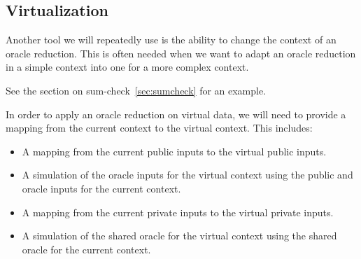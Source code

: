 



\subsection{Virtualization}

Another tool we will repeatedly use is the ability to change the context of an oracle reduction. This is often needed when we want to adapt an oracle reduction in a simple context into one for a more complex context.

See the section on sum-check~\ref{sec:sumcheck} for an example.

\begin{definition}
    \label{def:virtual_context_mapping}
    In order to apply an oracle reduction on virtual data, we will need to provide a mapping from the current context to the virtual context. This includes:
    \begin{itemize}
        \item A mapping from the current public inputs to the virtual public inputs.
        \item A simulation of the oracle inputs for the virtual context using the public and oracle
        inputs for the current context.
        \item A mapping from the current private inputs to the virtual private inputs.
        \item A simulation of the shared oracle for the virtual context using the shared oracle for
        the current context.
    \end{itemize}
\end{definition}

